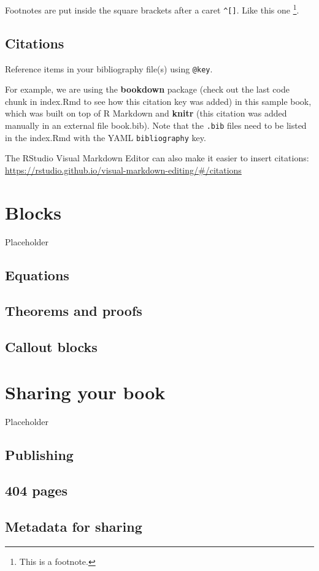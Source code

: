 \documentclass[
]{book}
\begin{document}
Footnotes are put inside the square brackets after a caret \texttt{\^{}{[}{]}}. Like this one \footnote{This is a footnote.}.

\hypertarget{citations}{%
\section{Citations}\label{citations}}

Reference items in your bibliography file(s) using \texttt{@key}.

For example, we are using the \textbf{bookdown} package \citep{R-bookdown} (check out the last code chunk in index.Rmd to see how this citation key was added) in this sample book, which was built on top of R Markdown and \textbf{knitr} \citep{xie2015} (this citation was added manually in an external file book.bib).
Note that the \texttt{.bib} files need to be listed in the index.Rmd with the YAML \texttt{bibliography} key.

The RStudio Visual Markdown Editor can also make it easier to insert citations: \url{https://rstudio.github.io/visual-markdown-editing/\#/citations}

\hypertarget{blocks}{%
\chapter{Blocks}\label{blocks}}

Placeholder

\hypertarget{equations}{%
\section{Equations}\label{equations}}

\hypertarget{theorems-and-proofs}{%
\section{Theorems and proofs}\label{theorems-and-proofs}}

\hypertarget{callout-blocks}{%
\section{Callout blocks}\label{callout-blocks}}

\hypertarget{sharing-your-book}{%
\chapter{Sharing your book}\label{sharing-your-book}}

Placeholder

\hypertarget{publishing}{%
\section{Publishing}\label{publishing}}

\hypertarget{pages}{%
\section{404 pages}\label{pages}}

\hypertarget{metadata-for-sharing}{%
\section{Metadata for sharing}\label{metadata-for-sharing}}

  
\end{document}
